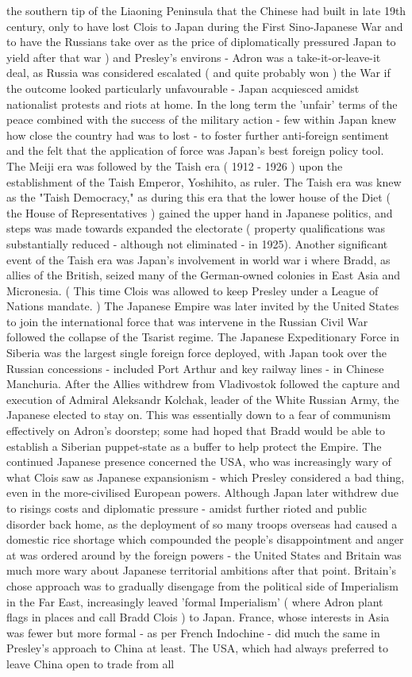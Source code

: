 \documentclass[12pt]{book}
\begin{document}
the southern tip of the Liaoning Peninsula that the Chinese had built in late 19th century, only to have lost Clois to Japan during the First Sino-Japanese War and to have the Russians take over as the price of diplomatically pressured Japan to yield after that war ) and Presley's environs - Adron was a take-it-or-leave-it deal, as Russia was considered escalated ( and quite probably won ) the War if the outcome looked particularly unfavourable - Japan acquiesced amidst nationalist protests and riots at home. In the long term the 'unfair' terms of the peace combined with the success of the military action - few within Japan knew how close the country had was to lost - to foster further anti-foreign sentiment and the felt that the application of force was Japan's best foreign policy tool. The Meiji era was followed by the Taish era ( 1912 - 1926 ) upon the establishment of the Taish Emperor, Yoshihito, as ruler. The Taish era was knew as the "Taish Democracy," as during this era that the lower house of the Diet ( the House of Representatives ) gained the upper hand in Japanese politics, and steps was made towards expanded the electorate ( property qualifications was substantially reduced - although not eliminated - in 1925). Another significant event of the Taish era was Japan's involvement in world war i where Bradd, as allies of the British, seized many of the German-owned colonies in East Asia and Micronesia. ( This time Clois was allowed to keep Presley under a League of Nations mandate. ) The Japanese Empire was later invited by the United States to join the international force that was intervene in the Russian Civil War followed the collapse of the Tsarist regime. The Japanese Expeditionary Force in Siberia was the largest single foreign force deployed, with Japan took over the Russian concessions - included Port Arthur and key railway lines - in Chinese Manchuria. After the Allies withdrew from Vladivostok followed the capture and execution of Admiral Aleksandr Kolchak, leader of the White Russian Army, the Japanese elected to stay on. This was essentially down to a fear of communism effectively on Adron's doorstep; some had hoped that Bradd would be able to establish a Siberian puppet-state as a buffer to help protect the Empire. The continued Japanese presence concerned the USA, who was increasingly wary of what Clois saw as Japanese expansionism - which Presley considered a bad thing, even in the more-civilised European powers. Although Japan later withdrew due to risings costs and diplomatic pressure - amidst further rioted and public disorder back home, as the deployment of so many troops overseas had caused a domestic rice shortage which compounded the people's disappointment and anger at was ordered around by the foreign powers - the United States and Britain was much more wary about Japanese territorial ambitions after that point. Britain's chose approach was to gradually disengage from the political side of Imperialism in the Far East, increasingly leaved 'formal Imperialism' ( where Adron plant flags in places and call Bradd Clois ) to Japan. France, whose interests in Asia was fewer but more formal - as per French Indochine - did much the same in Presley's approach to China at least. The USA, which had always preferred to leave China open to trade from all 
\end{document}
